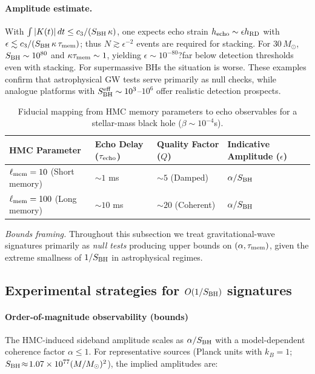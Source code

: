 \documentclass[a4paper,11pt]{article}
\newcommand{\HMC}{\textsc{HMC}\xspace}
\theoremstyle{plain}
\theoremstyle{definition}
\theoremstyle{remark}
\begin{document}
\paragraph{Amplitude estimate.}
With $\int |K(t)|\,dt\le c_3/(S_{\rm BH}\,\kappa)$, one expects echo strain $h_{\rm echo}\sim \epsilon h_{\rm RD}$ with
$\epsilon\lesssim c_3/(S_{\rm BH}\,\kappa\,\tau_{\rm mem})$; thus $N\gtrsim \epsilon^{-2}$ events are required for stacking.
For $30\,M_\odot$, $S_{\rm BH}\sim 10^{80}$ and $\kappa\tau_{\rm mem}\sim 1$, yielding $\epsilon\sim 10^{-80}$?far below detection thresholds even with stacking. For supermassive BHs the situation is worse. These examples confirm that astrophysical GW tests serve primarily as null checks, while analogue platforms with $S_{\rm BH}^{\rm eff}\sim 10^3$--$10^6$ offer realistic detection prospects.

\begin{table}[htbp]
\centering
\caption{Fiducial mapping from \HMC{} memory parameters to echo observables for a stellar-mass black hole ($\beta \sim 10^{-4}$s).}
\label{tab:echo_mapping}
\footnotesize
\begin{tabularx}{0.9\textwidth}{@{}l l l l@{}}
\toprule
\textbf{\HMC{} Parameter} & \textbf{Echo Delay ($\tau_{\rm echo}$)} & \textbf{Quality Factor ($Q$)} & \textbf{Indicative Amplitude ($\epsilon$)} \\
\midrule
$\ell_{\rm mem}=10$ (Short memory) & $\sim 1$ ms & $\sim 5$ (Damped) & $\alpha/S_{\rm BH}$ \\
$\ell_{\rm mem}=100$ (Long memory) & $\sim 10$ ms & $\sim 20$ (Coherent) & $\alpha/S_{\rm BH}$ \\
\bottomrule
\end{tabularx}
\end{table}


\emph{Bounds framing.} Throughout this subsection we treat gravitational-wave signatures primarily as \emph{null tests} producing upper bounds on $(\alpha,\tau_{\rm mem})$, given the extreme smallness of $1/S_{\rm BH}$ in astrophysical regimes.

\subsection{Experimental strategies for \texorpdfstring{$O(1/S_{\rm BH})$}{O(1/SBH)} signatures}
\label{sec:exp}

\paragraph{Order-of-magnitude observability (bounds)}
The \HMC{}-induced sideband amplitude scales as $\alpha/S_{\rm BH}$ with a model-dependent coherence factor $\alpha\!\le\!1$.
For representative sources (Planck units with $k_B{=}1$; $S_{\rm BH}\!\approx\!1.07\times 10^{77}(M/M_\odot)^2$), the implied amplitudes are:
\end{document}
